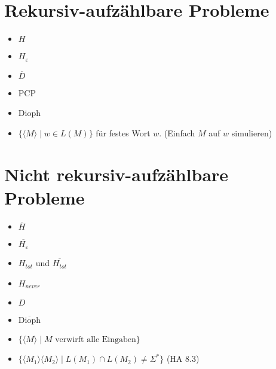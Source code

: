 \documentclass[a4paper,graphics,11pt]{article}
\newcommand{\eps}[0]{\varepsilon}
\newcommand{\godel}[1]{\langle #1 \rangle}
\begin{document}
\newpage

\section*{Rekursiv-aufzählbare Probleme}
\begin{itemize}
    \item $H$
    \item $H_\eps$
    \item $\overline{D}$
    \item PCP
    \item Dioph
    \item $\{\godel{M}\mid w \in L(M)\}$ für festes Wort $w$.
        (Einfach $M$ auf $w$ simulieren)
\end{itemize}

\section*{Nicht rekursiv-aufzählbare Probleme}
\begin{itemize}
    \item $\overline{H}$
    \item $\overline{H_\eps}$
    \item $H_{tot}$ und $\overline{H_{tot}}$
    \item $H_{never}$
    \item $D$
    \item $\overline{\text{Dioph}}$
    \item $\{\godel{M} \mid M \text{ verwirft alle Eingaben}\}$
    \item $\{\godel{M_1}\godel{M_2} \mid L(M_1) \cap L(M_2) \neq \Sigma^*\}$ (HA 8.3)\\
\end{itemize}
\end{document}
